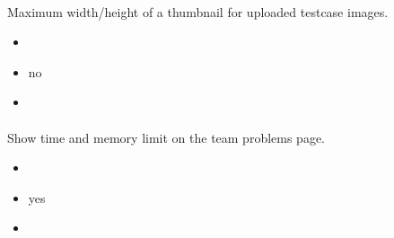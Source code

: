 \documentclass[a4paper,10pt,english,openany]{sphinxmanual}
\begin{document}
\paragraph{}
\label{\detokenize{configuration-reference:thumbnail-size}}
\sphinxAtStartPar
Maximum width/height of a thumbnail for uploaded testcase images.
\begin{itemize}
\item {} 
\sphinxAtStartPar
{} 

\item {} 
\sphinxAtStartPar
{} no

\item {} 
\sphinxAtStartPar
{} 

\end{itemize}


\paragraph{}
\label{\detokenize{configuration-reference:show-limits-on-team-page}}
\sphinxAtStartPar
Show time and memory limit on the team problems page.
\begin{itemize}
\item {} 
\sphinxAtStartPar
{} 

\item {} 
\sphinxAtStartPar
{} yes

\item {} 
\sphinxAtStartPar
{} 

\end{itemize}
\end{document}
